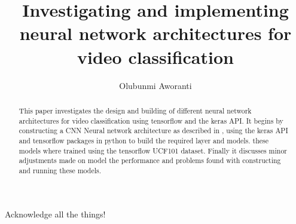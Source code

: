 
\title{Investigating and implementing neural network architectures for video classification}
\author{Olubunmi Aworanti}

\maketitle
\makedeclaration

\begin{abstract} %
  This paper investigates the design and building of different neural network architectures for video classification using tensorflow and the keras API. It begins by constructing a CNN Neural network architecture as described in \citep{KarpathyCVPR14}, using the keras API and tensorflow packages in python to build the required layer and models. these models where trained using the tensorflow UCF101 dataset. Finally it discusses minor adjustments made on model the performance and problems found with constructing and running these models.
\end{abstract}

\begin{acknowledgements}
Acknowledge all the things!
\end{acknowledgements}

\setcounter{tocdepth}{2} 

\tableofcontents
\listoffigures
\listoftables

